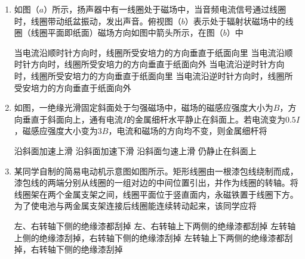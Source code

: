 \begin{enumerate}
\item
{}
如图（$ a $）所示，扬声器中有一线圈处于磁场中，当音频电流信号通过线圈时，线圈带动纸盆振动，发出声音。俯视图（$ b $）表示处于辐射状磁场中的线圈（线圈平面即纸面）磁场方向如图中箭头所示，在图（$ b $）中  
\begin{figure}[h!]
\centering
\begin{subfigure}{0.4\linewidth}
	\centering
	 
	\caption{}\label{}
\end{subfigure}
\begin{subfigure}{0.4\linewidth}
	\centering
	 
	\caption{}\label{}
\end{subfigure}
\end{figure}


\fourchoices
{当电流沿顺时针方向时，线圈所受安培力的方向垂直于纸面向里}
{当电流沿顺时针方向时，线圈所受安培力的方向垂直于纸面向外}
{当电流沿逆时针方向时，线圈所受安培力的方向垂直于纸面向里}
{当电流沿逆时针方向时，线圈所受安培力的方向垂直于纸面向外}





\item
{}
如图，一绝缘光滑固定斜面处于匀强磁场中，磁场的磁感应强度大小为$ B $，方向垂直于斜面向上，通有电流$ I $的金属细杆水平静止在斜面上。若电流变为$ 0.5I $，磁感应强度大小变为$ 3B $，电流和磁场的方向均不变，则金属细杆将  
\begin{figure}[h!]
	\centering

\end{figure}


\fourchoices
{沿斜面加速上滑}
{沿斜面加速下滑}
{沿斜面匀速上滑}
{仍静止在斜面上 }




\item
{}
某同学自制的简易电动机示意图如图所示。矩形线圈由一根漆包线绕制而成，漆包线的两端分别从线圈的一组对边的中间位置引出，并作为线圈的转轴。将线圈架在两个金属支架之间，线圈平面位于竖直面内，永磁铁置于线圈下方。为了使电池与两金属支架连接后线圈能连续转动起来，该同学应将  
\begin{figure}[h!]
\centering

\end{figure}


\fourchoices
{左、右转轴下侧的绝缘漆都刮掉}
{左、右转轴上下两侧的绝缘漆都刮掉}
{左转轴上侧的绝缘漆刮掉，右转轴下侧的绝缘漆刮掉}
{左转轴上下两侧的绝缘漆都刮掉，右转轴下侧的绝缘漆刮掉}





\end{enumerate}
